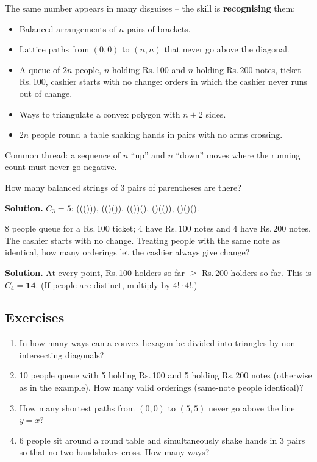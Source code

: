 \documentclass[11pt,a4paper,openany]{report}
\newenvironment{exercises}{\subsection*{Exercises \thechapter}\begin{enumerate}[label=\textbf{\thechapter.\arabic*},leftmargin=3.2em]}{\end{enumerate}}
\newcommand{\Rs}{Rs.\,}
\begin{document}
The same number appears in many disguises -- the skill is \textbf{recognising} them:
\begin{itemize}
\item Balanced arrangements of $n$ pairs of brackets.
\item Lattice paths from $(0,0)$ to $(n,n)$ that never go above the diagonal.
\item A queue of $2n$ people, $n$ holding \Rs100 and $n$ holding \Rs200 notes, ticket \Rs100, cashier starts with no change: orders in which the cashier never runs out of change.
\item Ways to triangulate a convex polygon with $n+2$ sides.
\item $2n$ people round a table shaking hands in pairs with no arms crossing.
\end{itemize}
Common thread: a sequence of $n$ ``up'' and $n$ ``down'' moves where the running count must never go negative.

\begin{example}
How many balanced strings of 3 pairs of parentheses are there?

\textbf{Solution.} $C_3=5$: ((())), (()()), (())(), ()(()), ()()().
\end{example}

\begin{example}
8 people queue for a \Rs100 ticket; 4 have \Rs100 notes and 4 have \Rs200 notes. The cashier starts with no
change. Treating people with the same note as identical, how many orderings let the cashier always give change?

\textbf{Solution.} At every point, \Rs100-holders so far $\ge$ \Rs200-holders so far. This is $C_4=\mathbf{14}$.
(If people are distinct, multiply by $4!\cdot4!$.)
\end{example}

\begin{exercises}
\item In how many ways can a convex hexagon be divided into triangles by non-intersecting diagonals?
\item 10 people queue with 5 holding \Rs100 and 5 holding \Rs200 notes (otherwise as in the example). How many valid orderings (same-note people identical)?
\item How many shortest paths from $(0,0)$ to $(5,5)$ never go above the line $y=x$?
\item 6 people sit around a round table and simultaneously shake hands in 3 pairs so that no two handshakes cross. How many ways?
\end{exercises}
\end{document}
